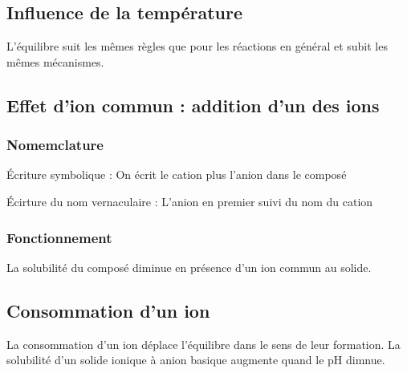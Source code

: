 \documentclass[french]{yLectureNote}
\begin{document}
\subsection{Influence de la température}
L'équilibre suit les m\^emes règles que pour les réactions en général et subit les m\^emes mécanismes.
\subsection{Effet d'ion commun : addition d'un des ions}
\subsubsection{Nomemclature}
Écriture symbolique : On écrit le cation plus l'anion dans le composé

Écirture du nom vernaculaire : L'anion en premier suivi du nom du cation
\subsubsection{Fonctionnement}
\begin{definition}
La solubilité du composé diminue en présence d'un ion commun au solide.
\end{definition}
\subsection{Consommation d'un ion}
\begin{theorem}
 La consommation d'un ion déplace l'équilibre dans le sens de leur formation. La solubilité d'un solide ionique à anion basique augmente quand le pH dimnue.
\end{theorem}
\end{document}
